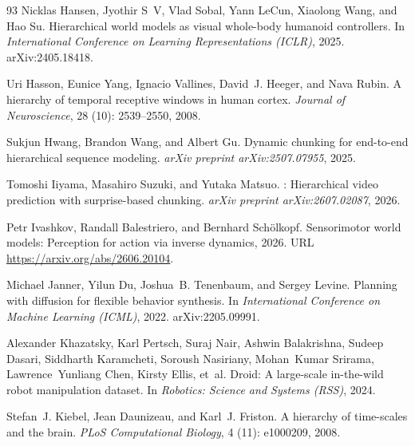 \begin{thebibliography}{93}
Nicklas Hansen, Jyothir S~V, Vlad Sobal, Yann LeCun, Xiaolong Wang, and Hao Su.
\newblock Hierarchical world models as visual whole-body humanoid controllers.
\newblock In \emph{International Conference on Learning Representations
  (ICLR)}, 2025.
\newblock arXiv:2405.18418.

Uri Hasson, Eunice Yang, Ignacio Vallines, David~J. Heeger, and Nava Rubin.
\newblock A hierarchy of temporal receptive windows in human cortex.
\newblock \emph{Journal of Neuroscience}, 28 (10):
  2539--2550, 2008.

Sukjun Hwang, Brandon Wang, and Albert Gu.
\newblock Dynamic chunking for end-to-end hierarchical sequence modeling.
\newblock \emph{arXiv preprint arXiv:2507.07955}, 2025.

Tomoshi Iiyama, Masahiro Suzuki, and Yutaka Matsuo.
: Hierarchical video prediction with surprise-based chunking.
\newblock \emph{arXiv preprint arXiv:2607.02087}, 2026.

Petr Ivashkov, Randall Balestriero, and Bernhard Schölkopf.
\newblock Sensorimotor world models: Perception for action via inverse
  dynamics, 2026.
\newblock URL \url{https://arxiv.org/abs/2606.20104}.

Michael Janner, Yilun Du, Joshua~B. Tenenbaum, and Sergey Levine.
\newblock Planning with diffusion for flexible behavior synthesis.
\newblock In \emph{International Conference on Machine Learning (ICML)}, 2022.
\newblock arXiv:2205.09991.

Alexander Khazatsky, Karl Pertsch, Suraj Nair, Ashwin Balakrishna, Sudeep
  Dasari, Siddharth Karamcheti, Soroush Nasiriany, Mohan~Kumar Srirama,
  Lawrence~Yunliang Chen, Kirsty Ellis, et~al.
\newblock Droid: A large-scale in-the-wild robot manipulation dataset.
\newblock In \emph{Robotics: Science and Systems (RSS)}, 2024.

Stefan~J. Kiebel, Jean Daunizeau, and Karl~J. Friston.
\newblock A hierarchy of time-scales and the brain.
\newblock \emph{PLoS Computational Biology}, 4 (11):
  e1000209, 2008.


\end{thebibliography}

